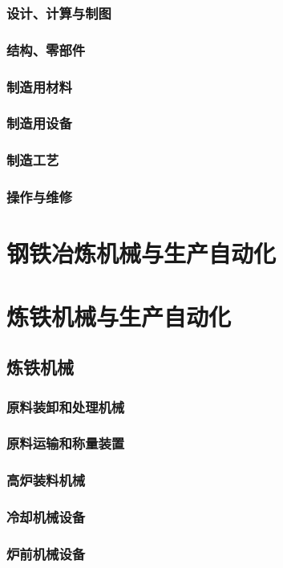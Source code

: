 \documentclass[UTF8]{../../ApplicationUniverse}
\begin{document}
    \subsubsection{设计、计算与制图}
    \subsubsection{结构、零部件}
    \subsubsection{制造用材料}
    \subsubsection{制造用设备}
    \subsubsection{制造工艺}
    \subsubsection{操作与维修}
\section{钢铁冶炼机械与生产自动化}
\section{炼铁机械与生产自动化}
    \subsection{炼铁机械}
        \subsubsection{原料装卸和处理机械}
        \subsubsection{原料运输和称量装置}
        \subsubsection{高炉装料机械}
        \subsubsection{冷却机械设备}
        \subsubsection{炉前机械设备}
\end{document}
